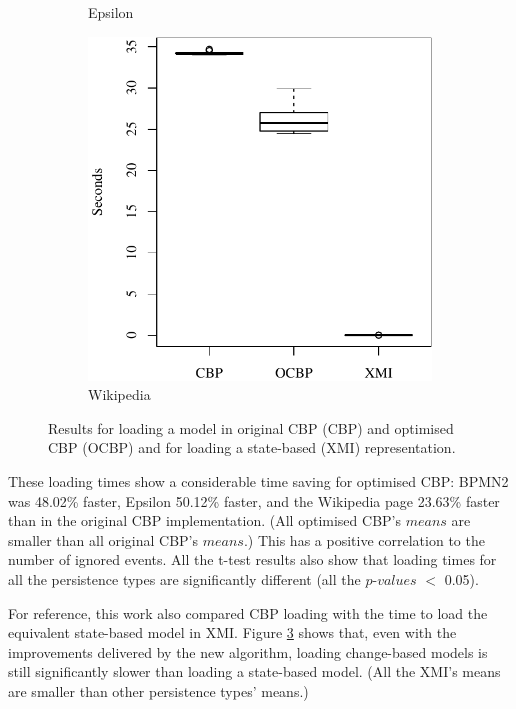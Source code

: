 \begin{figure}[ht]
\begin{subfigure}{0.325\textwidth}
      \caption{Epsilon}
      \label{fig:load_time_epsilon}
    \end{subfigure}
    \hfill
    \begin{subfigure}{0.325\textwidth}
      \centering
      \includegraphics[width=\linewidth]{images/ol_load_time_wikipedia}
      \caption{Wikipedia}
      \label{fig:load_time_wikipedia}
    \end{subfigure}
    \caption{Results for loading a model in original CBP (CBP) and optimised CBP (OCBP) and for loading a state-based (XMI) representation.}
    \label{fig:loadtime}
  \end{figure}
  
  These loading times show a considerable time saving for optimised CBP: BPMN2 was 48.02\% faster, Epsilon 50.12\% faster, and the Wikipedia page 23.63\% faster than in the original CBP implementation. (All optimised CBP’s $means$ are smaller than all original CBP’s $means$.) This has a positive correlation to the number of ignored events. All the t-test results also show that loading times for all the persistence types are significantly different (all the $p$-$values$ $<$ 0.05).
  
  For reference, this work also compared CBP loading with the time to load the equivalent state-based model in XMI. Figure \ref{fig:loadtime} shows that, even with the improvements delivered by the new algorithm, loading change-based models is still significantly slower than loading a state-based model. (All the XMI’s means are smaller than other persistence types’ means.)
  
